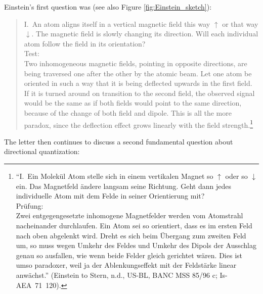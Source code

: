 \documentclass[12pt]{article}
\begin{document}
Einstein's first question was (see also Figure \ref{fig:Einstein_sketch}):
\begin{quote}
I.~An atom aligns itself in a vertical magnetic field this way $\uparrow$ or that way $\downarrow$. The magnetic field is slowly changing its direction. Will each individual atom follow the field in its orientation?\\
Test:\\
Two inhomogeneous magnetic fields, pointing in opposite directions, are being traversed one after the other by the atomic beam. Let one atom be oriented in such a way that it is being deflected upwards in the first field. If it is turned around on transition to the second field, the observed signal would be the same as if both fields would point to the same direction, because of the change of both field and dipole. This is all the more paradox, since the deflection effect grows linearly with the field strength.\footnote{%
``I.~Ein Molekül Atom stelle sich in einem vertikalen Magnet so $\uparrow$ oder so $\downarrow$ ein. Das Magnetfeld ändere langsam seine Richtung. Geht dann jedes individuelle Atom mit dem Felde in seiner Orientierung mit?\\
Prüfung:\\
Zwei entgegengesetzte inhomogene Magnetfelder werden vom Atomstrahl nacheinander durchlaufen. Ein Atom sei so orientiert, dass es im ersten Feld nach oben abgelenkt wird. Dreht es sich beim Übergang zum zweiten Feld um, so muss wegen Umkehr des Feldes und Umkehr des Dipols der Ausschlag genau so ausfallen, wie wenn beide Felder gleich gerichtet wären. Dies ist umso paradoxer, weil ja der Ablenkungseffekt mit der Feldstärke linear anwächst.''
(Einstein to Stern, n.d., US-BL, BANC MSS 85/96 c; Is-AEA~71~120).}
\end{quote}
The letter then continues to discuss a second fundamental question about directional quantization:
\end{document}
